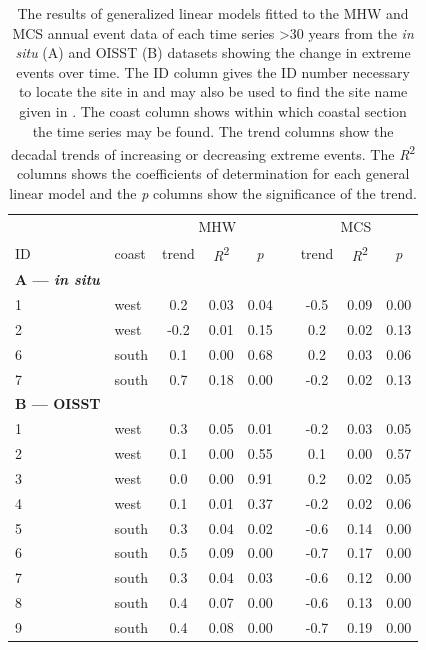 \documentclass[a4paper,10pt,review]{elsarticle}
\begin{document}
\begin{table}[]
\centering
\caption{\small The results of generalized linear models fitted to the MHW and MCS annual event data of each time series >30 years from the \emph{in situ} (A) and OISST (B) datasets showing the change in extreme events over time. The ID column gives the ID number necessary to locate the site in  and may also be used to find the site name given in . The coast column shows within which coastal section the time series may be found. The trend columns show the decadal trends of increasing or decreasing extreme events. The \emph{R}\textsuperscript{2} columns shows the coefficients of determination for each general linear model and the \emph{p} columns show the significance of the trend.}
\label{table4}
\begin{tiny}
\begin{tabular}{llccccccc}
\toprule
&& \multicolumn{3}{c}{MHW} & \phantom{abc} & \multicolumn{3}{c}{MCS} \\
\cmidrule{3-5} \cmidrule{7-9}
ID & coast & trend & \emph{R}\textsuperscript{2} & \emph{p} && trend & \emph{R}\textsuperscript{2} & \emph{p} \\
\midrule
{\bf{A} --- \emph{in situ}} \\
1 & west & 0.2 & 0.03 & 0.04 && -0.5 & 0.09 & 0.00 \\
  2 & west & -0.2 & 0.01 & 0.15 && 0.2 & 0.02 & 0.13 \\
  6 & south & 0.1 & 0.00 & 0.68 && 0.2 & 0.03 & 0.06 \\
  7 & south & 0.7 & 0.18 & 0.00 && -0.2 & 0.02 & 0.13 \\
{\bf{B} --- OISST} \\
  1 & west & 0.3 & 0.05 & 0.01 && -0.2 & 0.03 & 0.05 \\
  2 & west & 0.1 & 0.00 & 0.55 && 0.1 & 0.00 & 0.57 \\
  3 & west & 0.0 & 0.00 & 0.91 && 0.2 & 0.02 & 0.05 \\
  4 & west & 0.1 & 0.01 & 0.37 && -0.2 & 0.02 & 0.06 \\
  5 & south & 0.3 & 0.04 & 0.02 && -0.6 & 0.14 & 0.00 \\
  6 & south & 0.5 & 0.09 & 0.00 && -0.7 & 0.17 & 0.00 \\
  7 & south & 0.3 & 0.04 & 0.03 && -0.6 & 0.12 & 0.00 \\
  8 & south & 0.4 & 0.07 & 0.00 && -0.6 & 0.13 & 0.00 \\
  9 & south & 0.4 & 0.08 & 0.00 && -0.7 & 0.19 & 0.00 \\

\end{tabular}
\end{tiny}
\end{table}
\end{document}
